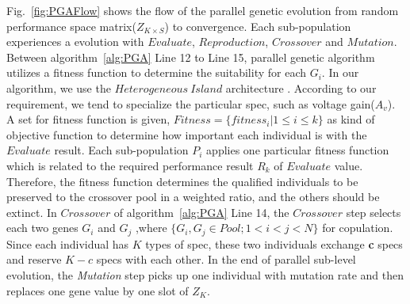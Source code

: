      Fig.~\ref{fig:PGAFlow} shows the flow of the parallel genetic evolution from random performance space matrix($Z_{K\times S}$) to convergence. Each sub-population experiences a evolution with $Evaluate$, $Reproduction$, $Crossover$ and $Mutation$. Between algorithm~\ref{alg:PGA} Line 12 to Line 15, parallel genetic algorithm utilizes a fitness function to determine the suitability for each $G_i$. In our algorithm, we use the $Heterogeneous\ Island$ architecture \cite{SurveyCGPGA1994}. According to our requirement, we tend to specialize the particular spec, such as voltage gain($A_v$). A set for fitness function is given, $Fitness = \{{fitness}_i| 1 \leq i \leq k\}$ as kind of objective function to determine how important each individual is with the $Evaluate$ result. Each sub-population $P_i$ applies one particular fitness function which is related to the required performance result $R_k$ of $Evaluate$ value. Therefore, the fitness function determines the qualified individuals to be preserved to the crossover pool in a weighted ratio, and the others should be extinct. In $Crossover$ of algorithm~\ref{alg:PGA} Line 14, the $Crossover$ step selects each two genes $G_i$ and $G_j$ ,where $\{G_i,G_j \in Pool; 1 < i<j<N\} $ for copulation. Since each individual has $K$ types of spec, these two individuals exchange {\bf c} specs and reserve {\bf $K-c$} specs with each other. In the end of parallel sub-level evolution, the {\it Mutation} step picks up one individual with mutation rate and then replaces one gene value by one slot of $Z_K$. 
    
